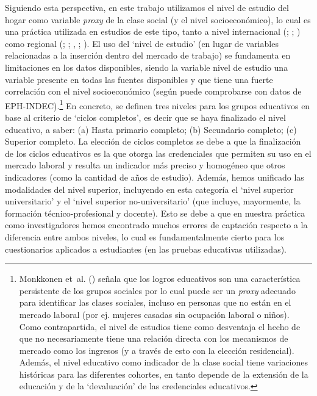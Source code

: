 \documentclass[
  spanish,
  a4paper,%
  chapterprefix=true,%
  DIV=calc,%
  twoside]{scrbook}%
\begin{document}
Siguiendo esta perspectiva, en este trabajo utilizamos el nivel de
estudio del hogar como variable \emph{proxy} de la clase social (y el nivel
socioeconómico), lo cual es una práctica utilizada en estudios de este
tipo, tanto a nivel internacional (; ; ) como regional (; ; , ; ). El uso del `nivel
de estudio' (en lugar de variables relacionadas a la inserción dentro
del mercado de trabajo) se fundamenta en limitaciones en los datos
disponibles, siendo la variable nivel de estudio una variable presente
en todas las fuentes disponibles y que tiene una fuerte correlación con
el nivel socioeconómico (según puede comprobarse con datos de
EPH-INDEC).\footnote{Monkkonen et~al. () señala que los logros educativos son una
  característica persistente de los grupos sociales por lo cual puede
  ser un \emph{proxy} adecuado para identificar las clases sociales,
  incluso en personas que no están en el mercado laboral (por ej.
  mujeres casadas sin ocupación laboral o niños).
  Como contrapartida,
  el nivel de estudios tiene como desventaja el hecho de que no
  necesariamente tiene una relación directa con los mecanismos de
  mercado como los ingresos (y a través de esto con la elección
  residencial). Además, el nivel educativo como indicador de la clase
  social tiene variaciones históricas para las diferentes cohortes, en
  tanto depende de la extensión de la educación y de la `devaluación'
  de las credenciales educativos.} En concreto, se definen tres niveles para los
grupos educativos en base al criterio de `ciclos completos', es decir
que se haya finalizado el nivel educativo, a saber: (a) Hasta primario
completo; (b) Secundario completo; (c) Superior completo. La elección de
ciclos completos se debe a que la finalización de los ciclos educativos
es la que otorga las credenciales que permiten su uso en el mercado
laboral y resulta un indicador más preciso y homogéneo que otros
indicadores (como la cantidad de años de estudio). Además, hemos
unificado las modalidades del nivel superior, incluyendo en esta
categoría el `nivel superior universitario' y el `nivel superior
no-universitario' (que incluye, mayormente, la formación
técnico-profesional y docente). Esto se debe a que en nuestra práctica
como investigadores hemos encontrado muchos errores de captación
respecto a la diferencia entre ambos niveles, lo cual es
fundamentalmente cierto para los cuestionarios aplicados a estudiantes
(en las pruebas educativas utilizadas).
\end{document}
